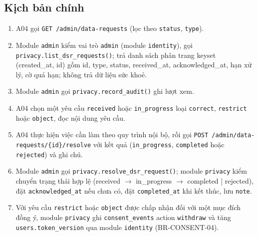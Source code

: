 \subsection{Kịch bản chính}
\begin{enumerate}
\item A04 gọi {\small\texttt{GET /\allowbreak{}\allowbreak{}admin/\allowbreak{}\allowbreak{}data-\allowbreak{}requests}} (lọc theo {\small\texttt{status}}, {\small\texttt{type}}).
\item Module {\small\texttt{admin}} kiểm vai trò {\small\texttt{admin}} (module {\small\texttt{identity}}), gọi {\small\texttt{privacy.\allowbreak{}list\_\allowbreak{}\allowbreak{}dsr\_\allowbreak{}\allowbreak{}requests()}}; trả danh sách phân trang keyset (created\_\allowbreak{}at, id) gồm id, type, status, received\_\allowbreak{}at, acknowledged\_\allowbreak{}at, hạn xử lý, cờ quá hạn; không trả dữ liệu sức khoẻ.
\item Module {\small\texttt{admin}} gọi {\small\texttt{privacy.\allowbreak{}record\_\allowbreak{}\allowbreak{}audit()}} ghi lượt xem.
\item A04 chọn một yêu cầu {\small\texttt{received}} hoặc {\small\texttt{in\_\allowbreak{}\allowbreak{}progress}} loại {\small\texttt{correct}}, {\small\texttt{restrict}} hoặc {\small\texttt{object}}, đọc nội dung yêu cầu.
\item A04 thực hiện việc cần làm theo quy trình nội bộ, rồi gọi {\small\texttt{POST /\allowbreak{}\allowbreak{}admin/\allowbreak{}\allowbreak{}data-\allowbreak{}requests/\allowbreak{}\allowbreak{}\{id\}/\allowbreak{}\allowbreak{}resolve}} với kết quả ({\small\texttt{in\_\allowbreak{}\allowbreak{}progress}}, {\small\texttt{completed}} hoặc {\small\texttt{rejected}}) và ghi chú.
\item Module {\small\texttt{admin}} gọi {\small\texttt{privacy.\allowbreak{}resolve\_\allowbreak{}\allowbreak{}dsr\_\allowbreak{}\allowbreak{}request()}}; module {\small\texttt{privacy}} kiểm chuyển trạng thái hợp lệ (received \ensuremath{\rightarrow} in\_\allowbreak{}progress \ensuremath{\rightarrow} completed |\allowbreak{} rejected), đặt {\small\texttt{acknowledged\_\allowbreak{}\allowbreak{}at}} nếu chưa có, đặt {\small\texttt{completed\_\allowbreak{}\allowbreak{}at}} khi kết thúc, lưu {\small\texttt{note}}.
\item Với yêu cầu {\small\texttt{restrict}} hoặc {\small\texttt{object}} được chấp nhận đối với một mục đích đồng ý, module {\small\texttt{privacy}} ghi {\small\texttt{consent\_\allowbreak{}\allowbreak{}events}} action {\small\texttt{withdraw}} và tăng {\small\texttt{users.\allowbreak{}token\_\allowbreak{}\allowbreak{}version}} qua module {\small\texttt{identity}} (BR-\allowbreak{}CONSENT-\allowbreak{}04).

\end{enumerate}

